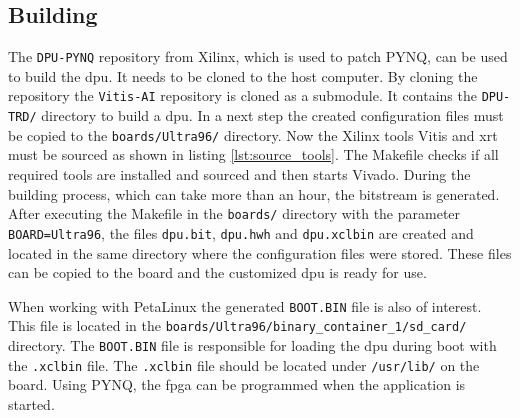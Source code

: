 \subsection{Building}
\label{subsec:embedded_platform:dpu:building}

The \texttt{DPU-PYNQ} repository from Xilinx, which is used to patch PYNQ, can be used to build the \acrshort{dpu}.
It needs to be cloned to the host computer.
By cloning the repository the \texttt{Vitis-AI} repository is cloned as a submodule.
It contains the \texttt{DPU-TRD/} directory to build a \acrshort{dpu}.
In a next step the created configuration files must be copied to the \texttt{boards/Ultra96/} directory.
Now the Xilinx tools Vitis and \acrshort{xrt} must be sourced as shown in listing \ref{lst:source_tools}.
The Makefile checks if all required tools are installed and sourced and then starts Vivado.
During the building process, which can take more than an hour, the bitstream is generated.
After executing the Makefile in the \texttt{boards/} directory with the parameter \texttt{BOARD=Ultra96}, the files \texttt{dpu.bit}, \texttt{dpu.hwh} and \texttt{dpu.xclbin} are created and located in the same directory where the configuration files were stored.
These files can be copied to the board and the customized \acrshort{dpu} is ready for use.

When working with PetaLinux the generated \texttt{BOOT.BIN} file is also of interest.
This file is located in the \texttt{boards/Ultra96/binary\_container\_1/sd\_card/} directory.
The \texttt{BOOT.BIN} file is responsible for loading the \acrshort{dpu} during boot with the \texttt{.xclbin} file.
The \texttt{.xclbin} file should be located under \texttt{/usr/lib/} on the board.
Using PYNQ, the \acrshort{fpga} can be programmed when the application is started.
